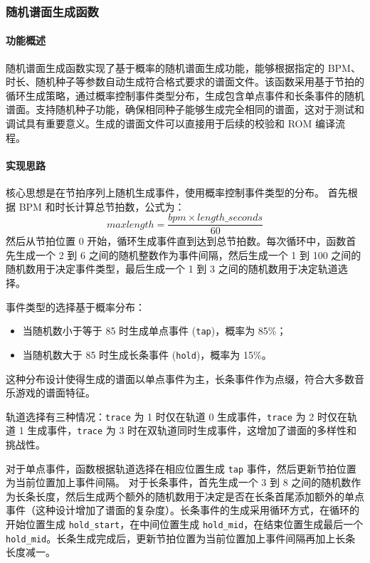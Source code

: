 \documentclass[12pt, a4paper]{article}
\begin{document}
\subsubsection{随机谱面生成函数}

\paragraph{功能概述}
随机谱面生成函数实现了基于概率的随机谱面生成功能，能够根据指定的 BPM、时长、随机种子等参数自动生成符合格式要求的谱面文件。该函数采用基于节拍的循环生成策略，通过概率控制事件类型分布，生成包含单点事件和长条事件的随机谱面。支持随机种子功能，确保相同种子能够生成完全相同的谱面，这对于测试和调试具有重要意义。生成的谱面文件可以直接用于后续的校验和 ROM 编译流程。

\paragraph{实现思路}
核心思想是在节拍序列上随机生成事件，使用概率控制事件类型的分布。
首先根据 BPM 和时长计算总节拍数，公式为：
\[ maxlength = \frac{bpm \times length\_seconds}{60} \]
然后从节拍位置 0 开始，循环生成事件直到达到总节拍数。每次循环中，函数首先生成一个 2 到 6 之间的随机整数作为事件间隔，然后生成一个 1 到 100 之间的随机数用于决定事件类型，最后生成一个 1 到 3 之间的随机数用于决定轨道选择。

事件类型的选择基于概率分布：
\begin{itemize}
    \item 当随机数小于等于 85 时生成单点事件 (\texttt{tap})，概率为 85\%；
    \item 当随机数大于 85 时生成长条事件 (\texttt{hold})，概率为 15\%。
\end{itemize}
这种分布设计使得生成的谱面以单点事件为主，长条事件作为点缀，符合大多数音乐游戏的谱面特征。

轨道选择有三种情况：\texttt{trace} 为 1 时仅在轨道 0 生成事件，\texttt{trace} 为 2 时仅在轨道 1 生成事件，\texttt{trace} 为 3 时在双轨道同时生成事件，这增加了谱面的多样性和挑战性。

对于单点事件，函数根据轨道选择在相应位置生成 \texttt{tap} 事件，然后更新节拍位置为当前位置加上事件间隔。
对于长条事件，首先生成一个 3 到 8 之间的随机数作为长条长度，然后生成两个额外的随机数用于决定是否在长条首尾添加额外的单点事件（这种设计增加了谱面的复杂度）。长条事件的生成采用循环方式，在循环的开始位置生成 \texttt{hold\_start}，在中间位置生成 \texttt{hold\_mid}，在结束位置生成最后一个 \texttt{hold\_mid}。长条生成完成后，更新节拍位置为当前位置加上事件间隔再加上长条长度减一。
\end{document}
